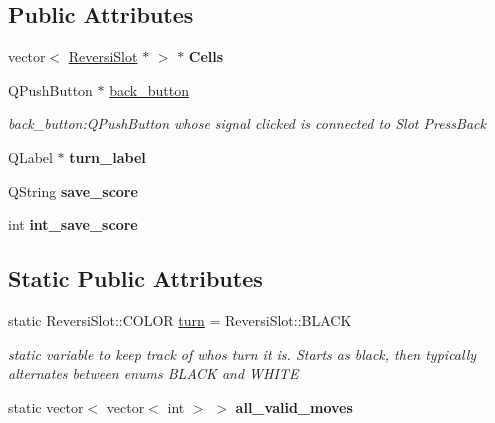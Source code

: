 \subsection*{Public Attributes}
\begin{DoxyCompactItemize}
\item 
\mbox{\label{classGame2Grid_a7ea67a012555b1d0ebb399f8dc5727f7}} 
vector$<$ \hyperlink{classReversiSlot}{Reversi\+Slot} $\ast$ $>$ $\ast$ {\bfseries Cells}
\item 
\mbox{\label{classGame2Grid_af6253e3276dc0761176754d7b809bbe0}} 
Q\+Push\+Button $\ast$ \hyperlink{classGame2Grid_af6253e3276dc0761176754d7b809bbe0}{back\+\_\+button}
\begin{DoxyCompactList}\small\item\em back\+\_\+button\+:Q\+Push\+Button whose signal clicked is connected to Slot Press\+Back \end{DoxyCompactList}\item 
\mbox{\label{classGame2Grid_a8fa6b4617803602470c056b31d637f31}} 
Q\+Label $\ast$ {\bfseries turn\+\_\+label}
\item 
\mbox{\label{classGame2Grid_a7928ebdf454b758fc661ad9165b8dc91}} 
Q\+String {\bfseries save\+\_\+score}
\item 
\mbox{\label{classGame2Grid_afc903c48873bea6053f88cbe80d21dc3}} 
int {\bfseries int\+\_\+save\+\_\+score}
\end{DoxyCompactItemize}
\subsection*{Static Public Attributes}
\begin{DoxyCompactItemize}
\item 
static Reversi\+Slot\+::\+C\+O\+L\+OR \hyperlink{classGame2Grid_a1b09031451ce6d9644e40d7e7a36697e}{turn} = Reversi\+Slot\+::\+B\+L\+A\+CK
\begin{DoxyCompactList}\small\item\em static variable to keep track of who\textquotesingle{}s turn it is. Starts as black, then typically alternates between enums B\+L\+A\+CK and W\+H\+I\+TE \end{DoxyCompactList}\item 
\mbox{\label{classGame2Grid_a8cceb431251ac1f4583aaf2698265efb}} 
static vector$<$ vector$<$ int $>$ $>$ {\bfseries all\+\_\+valid\+\_\+moves}
\end{DoxyCompactItemize}


